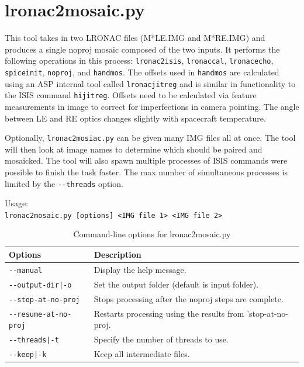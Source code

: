 \section{lronac2mosaic.py}
\label{lronac2mosaic}

This tool takes in two LRONAC files (M*LE.IMG and M*RE.IMG) and
produces a single noproj mosaic composed of the two inputs.  It
performs the following operations in this process:
\texttt{lronac2isis}, \texttt{lronaccal}, \texttt{lronacecho},
\texttt{spiceinit}, \texttt{noproj}, and \texttt{handmos}. The offsets
used in \texttt{handmos} are calculated using an ASP internal tool
called \texttt{lronacjitreg} and is similar in functionality to the
ISIS command \texttt{hijitreg}. Offsets need to be calculated via
feature measurements in image to correct for imperfections in camera
pointing. The angle between LE and RE optics changes slightly with
spacecraft temperature.

Optionally, \texttt{lronac2mosiac.py} can be given many IMG files all
at once. The tool will then look at image names to determine which
should be paired and mosaicked. The tool will also spawn multiple
processes of ISIS commands were possible to finish the task
faster. The max number of simultaneous processes is limited by the
\texttt{-\/-threads} option.

\medskip

Usage:\\
\hspace*{2em}\texttt{lronac2mosaic.py [options] <IMG file 1> <IMG file 2>}

\medskip

\begin{longtable}{|l|p{10cm}|}
\caption{Command-line options for lronac2mosaic.py}
\label{tbl:lronac2mosaic}
\endfirsthead
\endhead
\endfoot
\endlastfoot
\hline
Options & Description \\ \hline \hline
\texttt{-\/-manual} & Display the help message.\\ \hline
\texttt{-\/-output-dir|-o} & Set the output folder (default is input folder).\\ \hline
\texttt{-\/-stop-at-no-proj} & Stops processing after the noproj steps are complete. \\ \hline
\texttt{-\/-resume-at-no-proj} & Restarts processing using the results from 'stop-at-no-proj. \\ \hline
\texttt{-\/-threads|-t} & Specify the number of threads to use.\\ \hline
\texttt{-\/-keep|-k} & Keep all intermediate files.\\ \hline
\end{longtable}
